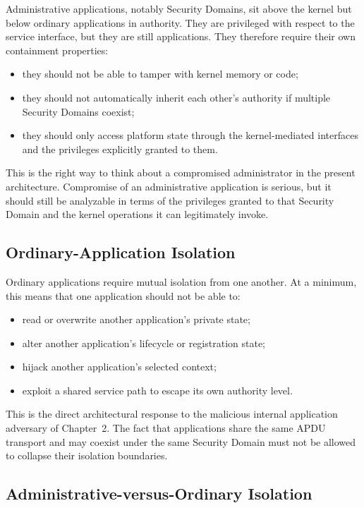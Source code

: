 Administrative applications, notably Security Domains, sit above the
kernel but below ordinary applications in authority. They are privileged
with respect to the service interface, but they are still applications.
They therefore require their own containment properties:
\begin{itemize}
\item they should not be able to tamper with kernel memory or code;
\item they should not automatically inherit each other's authority if
  multiple Security Domains coexist;
\item they should only access platform state through the kernel-mediated
  interfaces and the privileges explicitly granted to them.
\end{itemize}

This is the right way to think about a compromised administrator in the
present architecture. Compromise of an administrative application is
serious, but it should still be analyzable in terms of the privileges
granted to that Security Domain and the kernel operations it can
legitimately invoke.

\subsection{Ordinary-Application Isolation}

Ordinary applications require mutual isolation from one another. At a
minimum, this means that one application should not be able to:
\begin{itemize}
\item read or overwrite another application's private state;
\item alter another application's lifecycle or registration state;
\item hijack another application's selected context;
\item exploit a shared service path to escape its own authority level.
\end{itemize}

This is the direct architectural response to the malicious internal
application adversary of Chapter~2. The fact that applications share the
same APDU transport and may coexist under the same Security Domain must
not be allowed to collapse their isolation boundaries.

\subsection{Administrative-versus-Ordinary Isolation}

